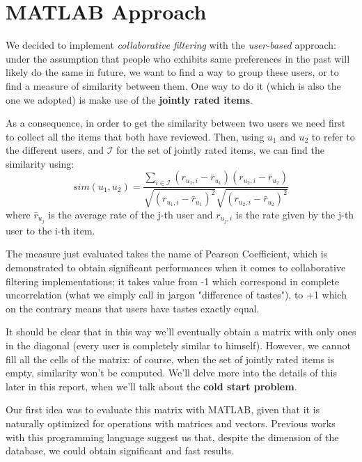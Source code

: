 \section{MATLAB Approach}

We decided to implement \textit{collaborative filtering} with the \textit{user-based} approach: under the assumption that people who exhibits same preferences in the past will likely do the same in future, we want to find a way to group these users, or to find a measure of similarity between them. One way to do it (which is also the one we adopted) is make use of the \textbf{jointly rated items}. 

As a consequence, in order to get the similarity between two users we need first to collect all the items that both have reviewed. Then, using $u_1$ and $u_2$ to refer to the different users, and $\mathcal{I}$ for the set of jointly rated items, we can find the similarity using:
\begin{equation}
	sim(u_1,u_2) = \frac{\sum_{i \in \mathcal{I}} (r_{u_1,i}-\bar{r}_{u_1}) (r_{u_2,i}-\bar{r}_{u_2})} {\sqrt{(r_{u_1,i}-\bar{r}_{u_1})^2}\sqrt{(r_{u_2,i}-\bar{r}_{u_2})^2}}
	\label{eq_1}
\end{equation}
where $\bar{r}_{u_j}$ is the average rate of the j-th user and $r_{u_j,i}$ is the rate given by the j-th user to the i-th item.

The measure just evaluated takes the name of Pearson Coefficient, which is demonstrated to obtain significant performances when it comes to collaborative filtering implementations; it takes value from -1 which correspond in complete uncorrelation (what we simply call in jargon "difference of tastes"), to +1 which on the contrary means that users have tastes exactly equal.
 
It should be clear that in this way we'll eventually obtain a matrix with only ones in the diagonal (every user is completely similar to himself). However, we cannot fill all the cells of the matrix: of course, when the set of jointly rated items is empty, similarity won't be computed. We'll delve more into the details of this later in this report, when we'll talk about the \textbf{cold start problem}.     

Our first idea was to evaluate this matrix with MATLAB, given that it is naturally optimized for operations with matrices and vectors. Previous works with this programming language suggest us that, despite the dimension of the database, we could obtain significant and fast results.

